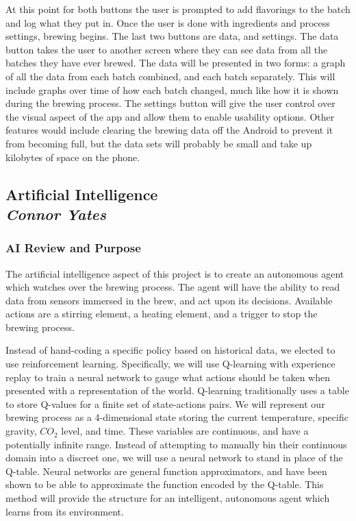 \documentclass[draftclsnofoot,onecolumn,letterpaper,10pt]{IEEEtran}
\begin{document}
At this point for both buttons the user is prompted to add flavorings to the batch and log what they put in.
Once the user is done with ingredients and process settings, brewing begins.
The last two buttons are data, and settings. The data button takes the user to another screen where they can see data from all the batches they have ever brewed.
The data will be presented in two forms: a graph of all the data from each batch combined, and each batch separately.
This will include graphs over time of how each batch changed, much like how it is shown during the brewing process.
The settings button will give the user control over the visual aspect of the app and allow them to enable usability options.
Other features would include clearing the brewing data off the Android to prevent it from becoming full, but the data sets will probably be small and take up kilobytes of space on the phone.


\subsection{Artificial Intelligence\\{\em\textbf{Connor Yates}}}
\subsubsection{AI Review and Purpose}
The artificial intelligence aspect of this project is to create an autonomous agent which watches over the brewing process.
The agent will have the ability to read data from sensors immersed in the brew, and act upon its decisions.
Available actions are a stirring element, a heating element, and a trigger to stop the brewing process.

Instead of hand-coding a specific policy based on historical data, we elected to use reinforcement learning.
Specifically, we will use Q-learning with experience replay to train a neural network to gauge what actions should be taken when presented with a representation of the world.
Q-learning traditionally uses a table to store Q-values for a finite set of state-actions pairs.
We will represent our brewing process as a 4-dimensional state storing the current temperature, specific gravity, $CO_2$ level, and time.
These variables are continuous, and have a potentially infinite range.
Instead of attempting to manually bin their continuous domain into a discreet one, we will use a neural network to stand in place of the Q-table.
Neural networks are general function approximators, and have been shown to be able to approximate the function encoded by the Q-table.
This method will provide the structure for an intelligent, autonomous agent which learns from its environment.
\end{document}
